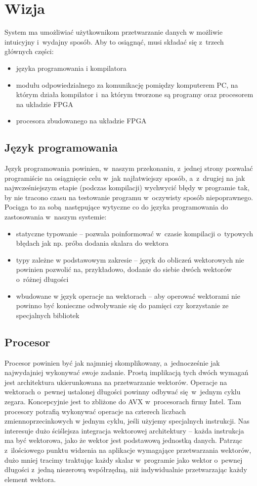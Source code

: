 \section{Wizja}
System ma umożliwiać użytkownikom przetwarzanie danych w możliwie intuicyjny i~wydajny sposób. Aby to osiągnąć, musi składać się z~trzech głównych części:
\begin{itemize}
  \item języka programowania i kompilatora
  \item modułu odpowiedzialnego za komunikację pomiędzy komputerem PC, na którym działa kompilator i~na którym tworzone są programy oraz procesorem na układzie FPGA
  \item procesora zbudowanego na układzie FPGA
\end{itemize}

\subsection{Język programowania}
Język programowania powinien, w~naszym przekonaniu, z~jednej strony pozwalać programiście na osiągnięcie celu w~jak najłatwiejszy sposób, a~z~drugiej na jak najwcześniejszym etapie (podczas kompilacji) wychwycić błędy w programie tak, by nie tracono czasu na testowanie programu w~oczywisty sposób niepoprawnego. Pociąga to za sobą następujące wytyczne co do języka programowania do zastosowania w~naszym systemie:

\begin{itemize}
  \item statyczne typowanie -- pozwala poinformować w~czasie kompilacji o~typowych błędach jak np. próba dodania skalara do wektora
  \item typy zależne w podstawowym zakresie -- język do obliczeń wektorowych nie powinien pozwolić na, przykładowo, dodanie do siebie dwóch wektorów o~różnej długości
  \item wbudowane w język operacje na wektorach -- aby operować wektorami nie powinno być konieczne odwoływanie się do pamięci czy korzystanie ze specjalnych bibliotek
\end{itemize}

\subsection{Procesor}
Procesor powinien być jak najmniej skomplikowany, a~jednocześnie jak najwydajniej wykonywać swoje zadanie. Prostą implikacją tych dwóch wymagań jest architektura ukierunkowana na przetwarzanie wektorów. Operacje na wektorach o~pewnej ustalonej długości powinny odbywać się w~jednym cyklu zegara. Koncepcyjnie jest to zbliżone do AVX w~procesorach firmy Intel. Tam procesory potrafią wykonywać operacje na czterech liczbach zmiennoprzecinkowych w jednym cyklu, jeśli użyjemy specjalnych instrukcji. Nas interesuje dużo ściślejsza integracja wektorowej architektury -- każda instrukcja ma być wektorowa, jako że wektor jest podstawową jednostką danych. Patrząc z~ilościowego punktu widzenia na aplikacje wymagające przetwarzania wektorów, dużo mniej tracimy traktując każdy skalar w~programie jako wektor o~pewnej długości z~jedną niezerową współrzędną, niż indywidualnie przetwarzając każdy element wektora.

